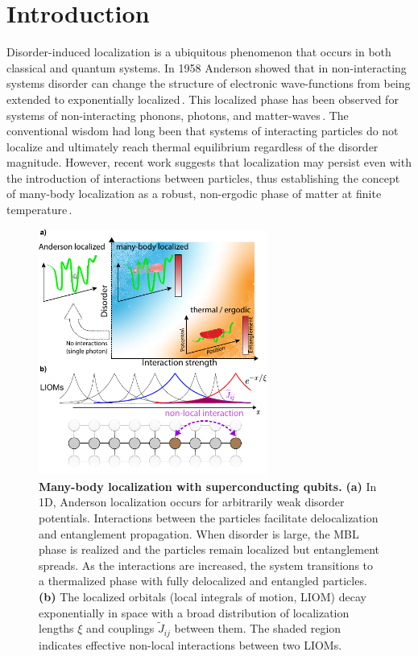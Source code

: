 \section{Introduction} %
Disorder-induced localization is a ubiquitous phenomenon that occurs in both classical and quantum systems. In 1958 Anderson showed that in non-interacting systems disorder can change the structure of electronic wave-functions from being extended to exponentially localized\,\cite{Anderson1958}. This localized phase has been observed for systems of non-interacting phonons, photons, and matter-waves\,\cite{The50years,Billy2008, Weaver1990, Wiersma1997, Schwartz2007}.  The conventional wisdom had long been that systems of interacting particles do not localize and ultimately reach thermal equilibrium regardless of the disorder magnitude. However, recent work suggests that localization may persist even with the introduction of interactions between particles, thus establishing the concept of many-body localization as a robust, non-ergodic phase of matter at finite temperature\,\cite{Basko2006, Gornyi2005, ImbriePRL2016}.

\begin{figure}[h!] %
\centering
\includegraphics[width=75mm]{./PDF/fig_1.pdf}
\caption{ \textbf{Many-body localization with superconducting qubits.} \textbf{(a)} In 1D, Anderson localization occurs for arbitrarily weak disorder potentials. Interactions between the particles facilitate delocalization and entanglement propagation. When disorder is large, the MBL phase is realized and the particles remain localized but entanglement spreads. As the interactions are increased, the system transitions to a thermalized phase with fully delocalized and entangled particles. \textbf{(b)} The localized orbitals (local integrals of motion, LIOM) decay exponentially in space with a broad distribution of localization lengths $\xi$ and couplings $\widetilde{J}_{ij}$ between them. The shaded region indicates effective non-local interactions between two LIOMs.}
\end{figure}

